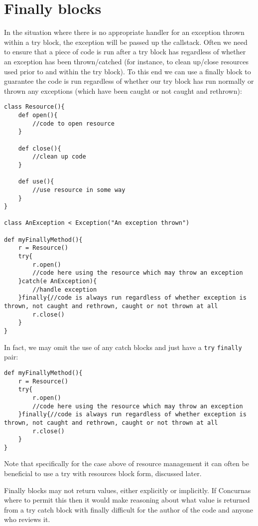 \documentclass[conc-doc]{subfiles}
\begin{document}
\section{Finally blocks}
In the situation where there is no appropriate handler for an exception thrown within a try block, the exception will be passed up the callstack. Often we need to ensure that a piece of code is run after a try block has regardless of whether an exception has been thrown/catched (for instance, to clean up/close resources used prior to and within the try block). To this end we can use a finally block to guarantee the code is run regardless of whether our try block has run normally or thrown any exceptions (which have been caught or not caught and rethrown):

\begin{lstlisting}
class Resource(){
	def open(){
		//code to open resource
	}
	
	def close(){
		//clean up code
	}
	
	def use(){
		//use resource in some way
	}
}

class AnException < Exception("An exception thrown")

def myFinallyMethod(){
	r = Resource()
	try{
		r.open()
		//code here using the resource which may throw an exception
	}catch(e AnException){
		//handle exception
	}finally{//code is always run regardless of whether exception is thrown, not caught and rethrown, caught or not thrown at all 
		r.close()
	}
}
\end{lstlisting}

In fact, we may omit the use of any catch blocks and just have a \lstinline{try} \lstinline{finally} pair:

\begin{lstlisting}
def myFinallyMethod(){
	r = Resource()
	try{
		r.open()
		//code here using the resource which may throw an exception
	}finally{//code is always run regardless of whether exception is thrown, not caught and rethrown, caught or not thrown at all 
		r.close()
	}
}
\end{lstlisting}

Note that specifically for the case above of resource management it can often be beneficial to use a try with resources block form, discussed later.

Finally blocks may not return values, either explicitly or implicitly. If Concurnas where to permit this then it would make reasoning about what value is returned from a try catch block with finally difficult for the author of the code and anyone who reviews it.
\end{document}
